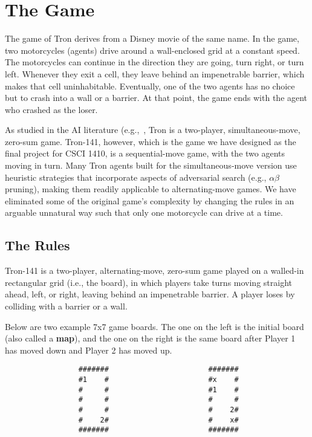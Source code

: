 \documentclass{article}
\newcommand{\amy}[1]{{\color{blue}[Amy: #1]}}
\begin{document}
\section{The Game}
The game of Tron derives from a Disney movie of the same name.  In the
game, two motorcycles (agents) drive around a wall-enclosed grid at a
constant speed.  The motorcycles can continue in the direction they
are going, turn right, or turn left.
Whenever they exit a cell, they leave behind an impenetrable barrier,
which makes that cell uninhabitable.  Eventually, one of the two
agents has no choice but to crash into a wall or a barrier.  At that
point, the game ends with the agent who crashed as the loser.

As studied in the AI literature
(e.g.,~\cite{teuling12,lanctot13,samothrakis10}, Tron is a two-player,
simultaneous-move, zero-sum game.  Tron-141, however, which is the
game we have designed as the final project for CSCI 1410, is a
sequential-move game, with the two agents moving in turn.  Many Tron
agents built for the simultaneous-move version use heuristic
strategies that incorporate aspects of adversarial search (e.g.,
$\alpha\beta$ pruning), making them readily applicable to
alternating-move games.  We have eliminated some of the original
game's complexity by changing the rules in an arguable unnatural way
such that only one motorcycle can drive at a time.


\subsection{The Rules}
Tron-141 is a two-player, alternating-move, zero-sum game played on a
walled-in rectangular grid (i.e., the board), in which players take
turns moving straight ahead, left, or right,
leaving behind an impenetrable barrier.
%
A player loses by colliding with a barrier or a wall.

Below are two example 7x7 game boards.  The one on the left is the
initial board (also called a \textbf{map}), and the one on the right
is the same board after Player 1 has moved down and Player 2 has moved
up.

\smallskip
\begin{verbatim}
                 #######                       #######
                 #1    #                       #x    #
                 #     #                       #1    #
                 #     #                       #     #
                 #     #                       #    2#
                 #    2#                       #    x#
                 #######                       #######
\end{verbatim}
\smallskip
\end{document}
